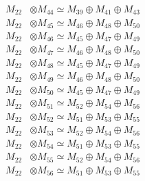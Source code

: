 \begin{align*}
M_{22} &\otimes M_{44} \simeq M_{39} \oplus M_{41} \oplus M_{43} \\
M_{22} &\otimes M_{45} \simeq M_{46} \oplus M_{48} \oplus M_{50} \\
M_{22} &\otimes M_{46} \simeq M_{45} \oplus M_{47} \oplus M_{49} \\
M_{22} &\otimes M_{47} \simeq M_{46} \oplus M_{48} \oplus M_{50} \\
M_{22} &\otimes M_{48} \simeq M_{45} \oplus M_{47} \oplus M_{49} \\
M_{22} &\otimes M_{49} \simeq M_{46} \oplus M_{48} \oplus M_{50} \\
M_{22} &\otimes M_{50} \simeq M_{45} \oplus M_{47} \oplus M_{49} \\
M_{22} &\otimes M_{51} \simeq M_{52} \oplus M_{54} \oplus M_{56} \\
M_{22} &\otimes M_{52} \simeq M_{51} \oplus M_{53} \oplus M_{55} \\
M_{22} &\otimes M_{53} \simeq M_{52} \oplus M_{54} \oplus M_{56} \\
M_{22} &\otimes M_{54} \simeq M_{51} \oplus M_{53} \oplus M_{55} \\
M_{22} &\otimes M_{55} \simeq M_{52} \oplus M_{54} \oplus M_{56} \\
M_{22} &\otimes M_{56} \simeq M_{51} \oplus M_{53} \oplus M_{55} \\
\end{align*}

